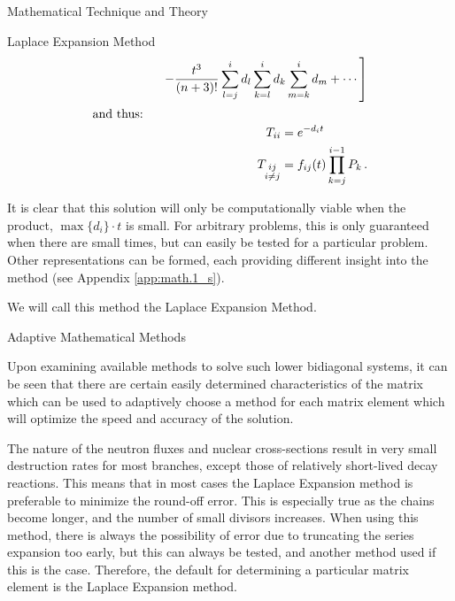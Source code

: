 \begin{chapter}{Mathematical Technique and Theory}
\begin{section}{Laplace Expansion Method}
\begin{align}
\begin{split}
      &\phantom{= t^{n-1} \left[\right.}
      \left.\quad\quad-\frac{t^3}{(n+3)!}\sum_{l=j}^{i}d_l \sum_{k=l}^i d_k \sum_{m=k}^i d_m 
        +\cdots \right ]\label{eqn:math.expansion.final}\\
    \end{split}\\
    \intertext{and thus:}
    \begin{split}
      T_{ii} &= e^{-d_i t}\\
      T_{\substack{ij\\i\neq j}} &= f_{ij}(t)\prod_{k=j}^{i-1}P_k \, .\\
    \end{split}
  \end{align}
  
  It is clear that this solution will only be computationally viable
  when the product, $\max \{d_i\} \cdot t$ is small.  For arbitrary
  problems, this is only guaranteed when there are small times, but
  can easily be tested for a particular problem.  Other
  representations can be formed, each providing different insight into
  the method (see Appendix \ref{app:math.1_s}).
    
  We will call this method the Laplace Expansion Method.

\end{section}

\begin{section}{Adaptive Mathematical Methods\label{sec:math.adaptive}}
  
  Upon examining available methods to solve such lower bidiagonal
  systems, it can be seen that there are certain easily determined
  characteristics of the matrix which can be used to adaptively choose
  a method for each matrix element which will optimize the speed and
  accuracy of the solution.
  
  The nature of the neutron fluxes and nuclear cross-sections result
  in very small destruction rates for most branches, except those of
  relatively short-lived decay reactions.  This means that in most
  cases the Laplace Expansion method is preferable to minimize the
  round-off error.  This is especially true as the chains become
  longer, and the number of small divisors increases.  When using this
  method, there is always the possibility of error due to truncating
  the series expansion too early, but this can always be tested, and
  another method used if this is the case.  Therefore, the default for
  determining a particular matrix element is the Laplace Expansion
  method.
  

\end{section}
\end{chapter}
